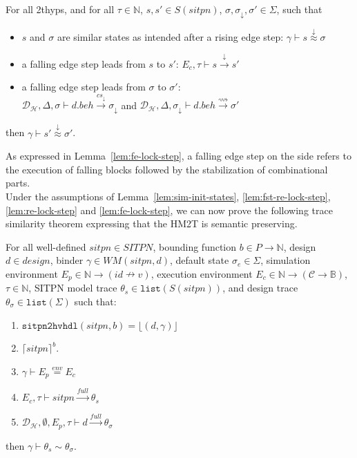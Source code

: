 \begin{lemma}
  \label{lem:fe-lock-step}
  For all \hm2thyps{}, and for all $\tau\in\mathbb{N}$,
  $s,s'\in{}S(sitpn)$, $\sigma,\sigma_\downarrow,\sigma'\in\Sigma$,
  such that
  \begin{itemize}
  \item $s$ and $\sigma$ are similar states as intended after a rising
    edge step: $\gamma\vdash{}s\stackrel{\downarrow}{\approx}\sigma$
  \item a falling edge step leads from $s$ to $s'$:
    $E_c,\tau\vdash{}s\xrightarrow{\downarrow}s'$
  \item a falling edge step leads from $\sigma$ to $\sigma'$:\\
    $\mathcal{D}_\mathcal{H},\Delta,\sigma\vdash{}d.beh\xrightarrow{cs_{\downarrow}}\sigma_{\downarrow}$
    and
    $\mathcal{D}_\mathcal{H},\Delta,\sigma_{\downarrow}\vdash{}d.beh\xrightarrow{\rightsquigarrow}\sigma'$
  \end{itemize}
  then $\gamma\vdash{}s'\stackrel{\downarrow}{\approx}{}\sigma'$.
\end{lemma}

As expressed in Lemma~\ref{lem:fe-lock-step}, a falling edge step on
the \hvhdl{} side refers to the execution of falling blocks followed
by the stabilization of combinational parts.\\

Under the assumptions of Lemma~\ref{lem:sim-init-states},
\ref{lem:fst-re-lock-step}, \ref{lem:re-lock-step} and
\ref{lem:fe-lock-step}, we can now prove the following trace
similarity theorem expressing that the HM2T is semantic preserving.

\begin{theorem}
  \label{thm:full-trace-sim}
  For all well-defined $sitpn\in{}SITPN$, bounding function
  $b\in{}P\rightarrow\mathbb{N}$, \hvhdl{} design $d\in{}design$,
  binder $\gamma\in{}WM(sitpn,d)$, default state $\sigma_e\in\Sigma$,
  simulation environment
  $E_p\in\mathbb{N}\rightarrow{}(id\nrightarrow{}v)$, execution
  environment
  $E_c\in\mathbb{N}\rightarrow(\mathcal{C}\rightarrow\mathbb{B})$,
  $\tau\in\mathbb{N}$, SITPN model trace
  $\theta_s\in\mathtt{list}(S(sitpn))$, and \hvhdl{} design trace
  $\theta_\sigma\in\mathtt{list}(\Sigma)$ such that:
  \begin{enumerate}
  \item $\mathtt{sitpn2hvhdl}(sitpn, b)=\lfloor(d,\gamma)\rfloor$
  \item $\lceil{}sitpn\rceil^b$.
  \item $\gamma\vdash{}E_p\stackrel{env}{=}E_c$
  \item $E_c,\tau\vdash{}sitpn\xrightarrow{full}\theta_s$
  \item
    $\mathcal{D}_\mathcal{H},\emptyset,E_p,\tau\vdash{}d\xrightarrow{full}\theta_\sigma$
  \end{enumerate}
  then $\gamma\vdash\theta_s\sim\theta_\sigma$.
\end{theorem}

